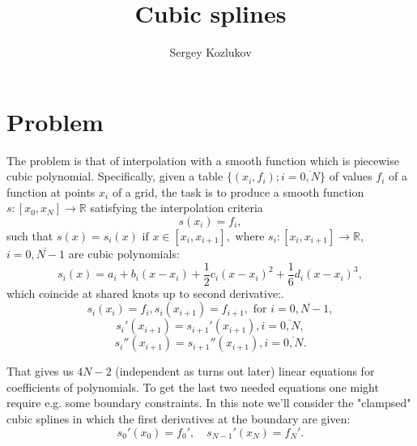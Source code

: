 \documentclass{article}
\title{Cubic splines}
\author{Sergey Kozlukov}
\begin{document}
\maketitle

\section{Problem}
The problem is that of interpolation with a smooth function
which is piecewise cubic polynomial.
Specifically,
given a table \( \{ (x_i, f_i); i=\overline{0,N} \} \)
of values \( f_i \) of a function at points \( x_i \) of a grid,
the task is to produce a smooth function \( s:\left[x_0,x_N\right]\to\mathbb{R} \)
satisfying the interpolation criteria
\[ s(x_i) = f_i, \]
such that
\( s(x)=s_i(x) \text{ if } x\in\left[x_i, x_{i+1}\right], \)
where \( s_i:\left[x_i, x_{i+1}\right]\to\mathbb{R} \), \( i=\overline{0,N-1} \)
are cubic polynomials:
\[ s_i(x) = a_i + b_i (x-x_i) + \frac12 c_i (x-x_i)^2 + \frac16 d_i (x-x_i)^3, \]
which coincide at shared knots up to second derivative:.
\begin{equation}\label{eq:f_i}
    s_i(x_i) = f_i, s_i(x_{i+1}) = f_{i+1}, \text{ for } i=\overline{0,N-1},
\end{equation}
\begin{equation}\label{eq:df_i}
 s_i'(x_{i+1}) = s_{i+1}'(x_{i+1}), i=\overline{0,N},
\end{equation}
\begin{equation}\label{eq:d2f_i}
 s_i''(x_{i+1}) = s_{i+1}''(x_{i+1}), i=\overline{0,N}.
\end{equation}

That gives us \( 4N-2 \) (independent as turns out later) linear equations for coefficients of polynomials.
To get the last two needed equations
one might require e.g. some boundary constraints.
In this note we'll consider the "clampsed" cubic splines
in which the first derivatives at the boundary are given:
\begin{equation}\label{eq:boundary}
   s_0'(x_0) = f_0',\quad s_{N-1}'(x_N) = f_N'.
\end{equation}
\end{document}
